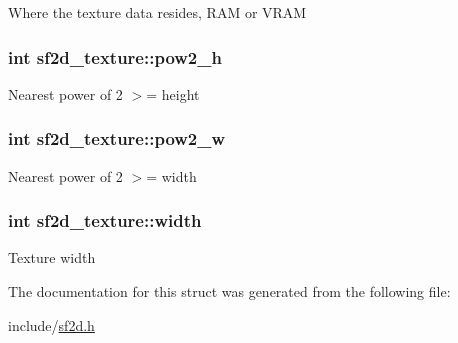 Where the texture data resides, R\-A\-M or V\-R\-A\-M \hypertarget{structsf2d__texture_a644c43b5fde6e12c8f1e3cb0280798e1}{
\subsubsection[{pow2\-\_\-h}]{\setlength{\rightskip}{0pt plus 5cm}int sf2d\-\_\-texture\-::pow2\-\_\-h}}\label{structsf2d__texture_a644c43b5fde6e12c8f1e3cb0280798e1}
Nearest power of 2 $>$= height \hypertarget{structsf2d__texture_aa1c5388828ad6d18ea37eb2e6ace7f48}{
\subsubsection[{pow2\-\_\-w}]{\setlength{\rightskip}{0pt plus 5cm}int sf2d\-\_\-texture\-::pow2\-\_\-w}}\label{structsf2d__texture_aa1c5388828ad6d18ea37eb2e6ace7f48}
Nearest power of 2 $>$= width \hypertarget{structsf2d__texture_a312abd0ee8ab587825804132c136b253}{
\subsubsection[{width}]{\setlength{\rightskip}{0pt plus 5cm}int sf2d\-\_\-texture\-::width}}\label{structsf2d__texture_a312abd0ee8ab587825804132c136b253}
Texture width 

The documentation for this struct was generated from the following file\-:\begin{DoxyCompactItemize}
\item 
include/\hyperlink{sf2d_8h}{sf2d.\-h}\end{DoxyCompactItemize}
